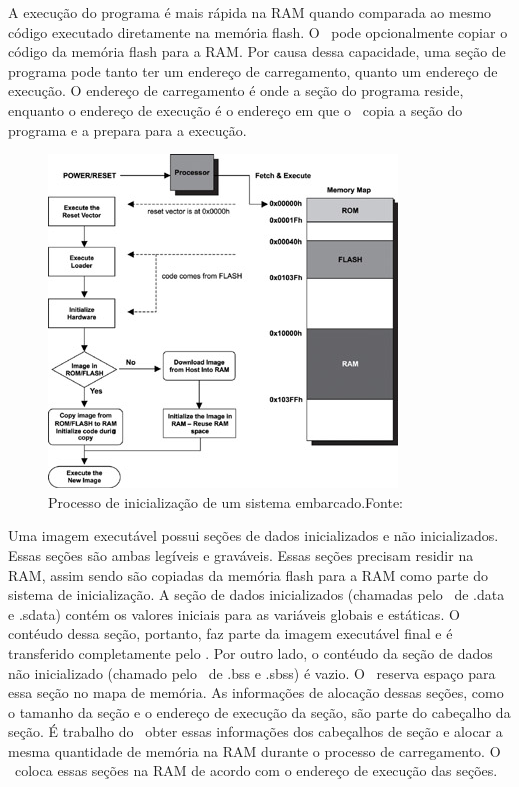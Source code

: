 A execução do programa é mais rápida na RAM quando comparada ao mesmo código executado diretamente na memória flash. O \loader\ pode opcionalmente copiar o código da memória flash para a RAM. Por causa dessa capacidade, uma seção de programa pode tanto ter um endereço de carregamento, quanto um endereço de execução. O endereço de carregamento é onde a seção do programa reside, enquanto o endereço de execução é o endereço em que o \loader\ copia a seção do programa e a prepara para a execução.

\begin{figure}[H]
    \scriptsize
     \centering
     \includegraphics[scale=1]{dados/figuras/BootOriginal.png}
     \caption{Processo de inicialização de um sistema embarcado.\newline Fonte:\cite{Qing2003}}
     \label{fig:INICIALIZAÇÃO}
\end{figure}

Uma imagem executável possui seções de dados inicializados e não inicializados. Essas seções são ambas legíveis e graváveis. Essas seções precisam residir na RAM, assim sendo são copiadas da memória flash para a RAM como parte do sistema de inicialização. A seção de dados inicializados (chamadas pelo \linker\ de .data e .sdata) contém os valores iniciais para as variáveis globais e estáticas. O contéudo dessa seção, portanto, faz parte da imagem executável final e é transferido completamente pelo \loader. Por outro lado, o contéudo da seção de dados não inicializado (chamado pelo \linker\ de .bss e .sbss) é vazio. O \linker\ reserva espaço para essa seção no mapa de memória. As informações de alocação dessas seções, como o tamanho da seção e o endereço de execução da seção, são parte do cabeçalho da seção. É trabalho do \loader\ obter essas informações dos cabeçalhos de seção e alocar a mesma quantidade de memória na RAM durante o processo de carregamento. O \loader\ coloca essas seções na RAM de acordo com o endereço de execução das seções.

